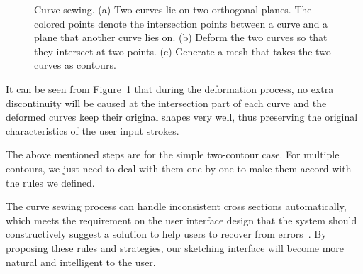 \begin{figure} [htbp]
{\begin{minipage}[b]{0.25\textwidth}
    \end{minipage}}
  \caption{Curve sewing. (a) Two curves lie on two orthogonal planes. The colored points denote the intersection points between a curve and a plane that another curve lies on. (b) Deform the two curves so that they intersect at two points. (c) Generate a mesh that takes the two curves as contours.}
  \label{fig:curvemerge} %
\end{figure}

It can be seen from Figure~\ref{fig:curvemerge} that  during the
deformation process, no extra discontinuity will be caused at the
intersection part of each curve and the deformed curves keep their
original shapes very well, thus preserving the original
characteristics of the user input strokes.

The above mentioned steps are for the simple two-contour  case. For
multiple contours, we just need to deal with them one by one to make
them accord with the rules we defined.

The curve sewing process can handle inconsistent cross sections
automatically, which meets the requirement on the user interface
design that the system should constructively suggest a solution to
help users to recover from errors~\cite{MN90}. By proposing these
rules and strategies, our sketching interface will become more
natural and intelligent to the user.


